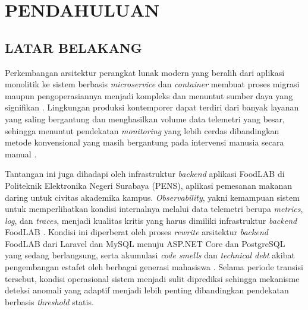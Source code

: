 \chapter{PENDAHULUAN}

\section{LATAR BELAKANG}

Perkembangan arsitektur perangkat lunak modern yang beralih dari aplikasi monolitik ke sistem berbasis \textit{microservice} dan \textit{container} membuat proses migrasi maupun pengoperasiannya menjadi kompleks dan menuntut sumber daya yang signifikan \cite{trabelsi2025systematic}. Lingkungan produksi kontemporer dapat terdiri dari banyak layanan yang saling bergantung dan menghasilkan volume data telemetri yang besar, sehingga menuntut pendekatan \textit{monitoring} yang lebih cerdas dibandingkan metode konvensional yang masih bergantung pada intervensi manusia secara manual \cite{hrusto2025monitoring}.

Tantangan ini juga dihadapi oleh infrastruktur \textit{backend} aplikasi FoodLAB di Politeknik Elektronika Negeri Surabaya (PENS), aplikasi pemesanan makanan daring untuk civitas akademika kampus. \textit{Observability}, yakni kemampuan sistem untuk memperlihatkan kondisi internalnya melalui data telemetri berupa \textit{metrics}, \textit{log}, dan \textit{traces}, menjadi kualitas kritis yang harus dimiliki infrastruktur \textit{backend} FoodLAB \cite{trinity2023}. Kondisi ini diperberat oleh proses \textit{rewrite} arsitektur \textit{backend} FoodLAB dari Laravel dan MySQL menuju ASP.NET Core dan PostgreSQL yang sedang berlangsung, serta akumulasi \textit{code smells} dan \textit{technical debt} akibat pengembangan estafet oleh berbagai generasi mahasiswa \cite{yulanda2025refactoring}. Selama periode transisi tersebut, kondisi operasional sistem menjadi sulit diprediksi sehingga mekanisme deteksi anomali yang adaptif menjadi lebih penting dibandingkan pendekatan berbasis \textit{threshold} statis.

